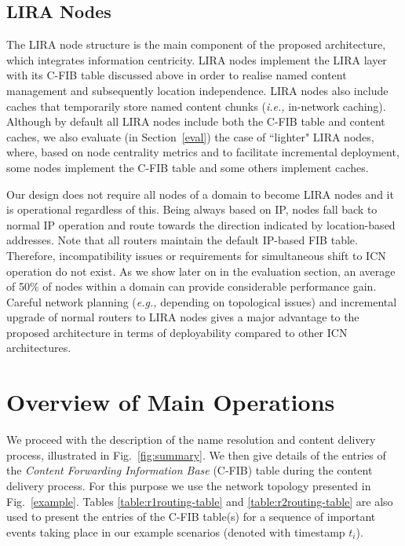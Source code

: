 \documentclass{sig-alternate}
\newcommand{\ie}{{\em i.e.,\/ }}
\newcommand{\eg}{{\em e.g.,\/ }}
\begin{document}
\subsection{LIRA Nodes}\label{lira-nodes}
The LIRA node structure is the main component of the proposed architecture, which integrates information centricity. LIRA nodes implement the LIRA layer with its C-FIB table discussed above in order to realise named content management and subsequently location independence. LIRA nodes also include caches that temporarily store named content chunks (\ie in-network caching). Although by default all LIRA nodes include both the C-FIB table and content caches, we also evaluate (in Section~\ref{eval}) the case of ``lighter" LIRA nodes, where, based on node centrality metrics and to facilitate incremental deployment, some nodes implement the C-FIB table and some others implement caches.

Our design does not require all nodes of a domain to become LIRA nodes and it is operational regardless of this. Being always based on IP, nodes fall back to normal IP operation and route towards the direction indicated by location-based addresses. Note that all routers maintain the default IP-based FIB table. Therefore, incompatibility issues or requirements for simultaneous shift to ICN operation do not exist. As we show later on in the evaluation section, an average of 50\% of nodes within a domain can provide considerable performance gain. Careful network planning (\eg depending on topological issues) and incremental upgrade of normal routers to LIRA nodes gives a major advantage to the proposed architecture in terms of deployability compared to other ICN architectures.

 

\makeatletter{}\section{Overview of Main Operations}\label{rsn-details}

We proceed with the description of the name resolution and content delivery process, illustrated in Fig.~\ref{fig:summary}. We then give details of the entries of the \textit{Content Forwarding Information Base} (C-FIB) table during the content delivery process. For this purpose we use the network topology presented in Fig.~\ref{example}.
Tables \ref{table:r1routing-table} and \ref{table:r2routing-table} are also used to present the entries of the C-FIB table(s) for a sequence of important events taking place in our example scenarios (denoted with timestamp $t_{i}$).
\end{document}
